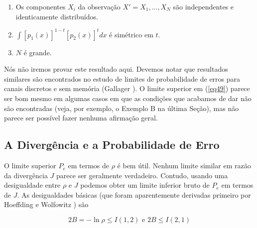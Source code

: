 \documentclass{sbrt2017port}
\begin{document}

\begin{enumerate}

	\item Os componentes $X_i$ da observação $ X' = X_1,...,X_N $ são independentes e identicamente distribuídos.
	\item $\int [p_1(x)]^{1-t}[p_2(x)]^tdx $ é simétrico  em $t$.
	\item $N$ é grande.

\end{enumerate}

Nós não iremos provar este resultado aqui. Devemos notar que resultados similares são encontrados no estudo de limites de probabilidade de erros para canais discretos e sem memória (Gallager \cite{r25}). O limite superior em (\ref{eq49}) parece ser bom mesmo em algumas casos em que as condições que acabamos de dar não são encontradas (veja, por exemplo, o Exemplo B na última Seção), mas não parece ser possível fazer nenhuma afirmação geral.

\subsection{A Divergência e a Probabilidade de Erro}

O limite superior $P_e$ em termos de $\rho$ é bem útil. Nenhum limite similar em razão da divergência $J$ parece ser geralmente verdadeiro. Contudo, usando uma desigualdade entre $\rho$ e $J$ podemos obter um limite inferior bruto de $P_e$ em termos de $J$. As desigualdades básicas (que foram aparentemente derivadas primeiro por Hoeffding e Wolfowitz \cite{r26}) são

\begin{equation}
	2B = - \ln \rho \leq I(1,2) \text{ e } 2B \leq I(2,1)
	\label{eq50}
\end{equation}
\end{document}
